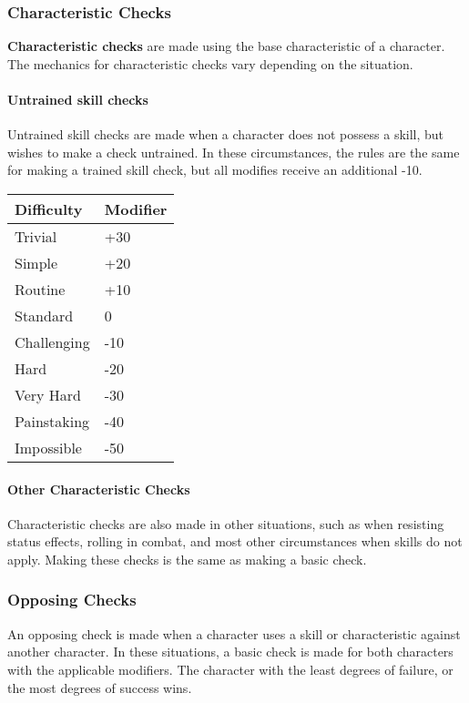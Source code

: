 \documentclass[]{article}
\let\oldparagraph\paragraph
\renewcommand{\paragraph}[1]{\oldparagraph{#1}\mbox{}}
\begin{document}
\subsubsection{Characteristic Checks}\label{characteristic-checks}

\textbf{Characteristic checks} are made using the base characteristic of
a character. The mechanics for characteristic checks vary depending on
the situation.

\paragraph{Untrained skill checks}\label{untrained-skill-checks}

Untrained skill checks are made when a character does not possess a
skill, but wishes to make a check untrained. In these circumstances, the
rules are the same for making a trained skill check, but all modifies
receive an additional -10.

\begin{longtable}[]{@{}ll@{}}
\toprule
Difficulty & Modifier\tabularnewline
\midrule
\endhead
Trivial & +30\tabularnewline
Simple & +20\tabularnewline
Routine & +10\tabularnewline
Standard & 0\tabularnewline
Challenging & -10\tabularnewline
Hard & -20\tabularnewline
Very Hard & -30\tabularnewline
Painstaking & -40\tabularnewline
Impossible & -50\tabularnewline
\bottomrule
\end{longtable}

\paragraph{Other Characteristic
Checks}\label{other-characteristic-checks}

Characteristic checks are also made in other situations, such as when
resisting status effects, rolling in combat, and most other
circumstances when skills do not apply. Making these checks is the same
as making a basic check.

\subsubsection{Opposing Checks}\label{opposing-checks}

An opposing check is made when a character uses a skill or
characteristic against another character. In these situations, a basic
check is made for both characters with the applicable modifiers. The
character with the least degrees of failure, or the most degrees of
success wins.
\end{document}
